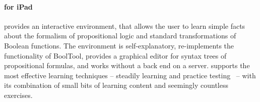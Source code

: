 \paragraph{\Nyaya for iPad}provides an interactive environment,
that allows the user to learn simple facts about the formalism of propositional logic 
and standard transformations of Boolean functions. 
The environment is self-explanatory, re-implements the functionality of  BoolTool,
provides a graphical editor for syntax trees of propositional formulas, and 
works without a back end on a server.
\Nyaya supports the most effective learning techniques – 
steadily learning and practice testing\ \cite{Dunlosky01012013} –
with its combination 
of small bits of learning content and seemingly countless exercises. 


%
